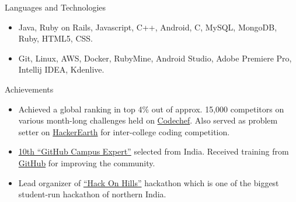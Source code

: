 \documentclass[]{mcdowellcv}
\begin{document}
	\begin{cvsection}{Languages and Technologies}
		\begin{cvsubsection}{}{}{}	
			\begin{itemize}
				\item Java, Ruby on Rails, Javascript, C++, Android, C, MySQL, MongoDB, Ruby, HTML5, CSS.
				\item Git, Linux, AWS, Docker, RubyMine, Android Studio, Adobe Premiere Pro, Intellij IDEA, Kdenlive.
			\end{itemize}
		\end{cvsubsection}
	\end{cvsection}
	
	\begin{cvsection}{Achievements}
		\begin{cvsubsection}{}{}{}	
			\begin{itemize}
				\item Achieved a global ranking in top 4\% out of approx. 15,000 competitors on various month-long challenges held on \href {https://www.codechef.com/}{Codechef}. Also served as problem setter on \href {https://www.hackerearth.com/}{HackerEarth} for inter-college coding competition.
				\item {\href {https://githubcampus.expert/sukhbir-singh/}{10th ``GitHub Campus Expert''}} selected from India. Received training from \href {https://github.com/}{GitHub} for improving the community.
				\item Lead organizer of {\href {http://hackonhills.com/}{``Hack On Hills''}} hackathon which is one of the biggest student-run hackathon of northern India.
			\end{itemize}
		\end{cvsubsection}
	\end{cvsection}
	
\end{document}
